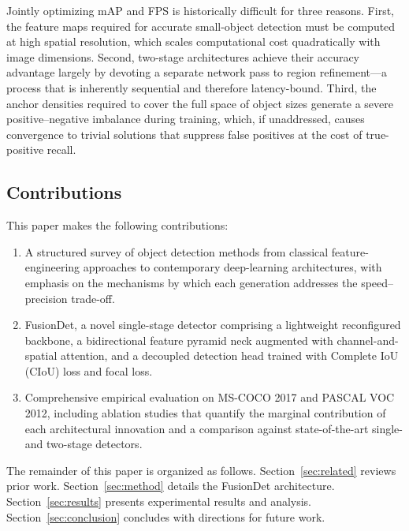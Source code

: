 Jointly optimizing mAP and FPS is historically difficult for
three reasons.  First, the feature maps required for accurate
small-object detection must be computed at high spatial
resolution, which scales computational cost quadratically with
image dimensions.  Second, two-stage architectures achieve
their accuracy advantage largely by devoting a separate network
pass to region refinement---a process that is inherently
sequential and therefore latency-bound.  Third, the anchor
densities required to cover the full space of object sizes
generate a severe positive--negative imbalance during training,
which, if unaddressed, causes convergence to trivial solutions
that suppress false positives at the cost of true-positive
recall.

\subsection{Contributions}

This paper makes the following contributions:
\begin{enumerate}
    \item A structured survey of object detection methods from
    classical feature-engineering approaches to contemporary
    deep-learning architectures, with emphasis on the
    mechanisms by which each generation addresses the
    speed--precision trade-off.
    \item FusionDet, a novel single-stage detector comprising
    a lightweight reconfigured backbone, a bidirectional
    feature pyramid neck augmented with channel-and-spatial
    attention, and a decoupled detection head trained with
    Complete IoU (CIoU) loss and focal loss.
    \item Comprehensive empirical evaluation on MS-COCO 2017
    and PASCAL VOC 2012, including ablation studies that
    quantify the marginal contribution of each architectural
    innovation and a comparison against state-of-the-art
    single- and two-stage detectors.
\end{enumerate}

The remainder of this paper is organized as follows.
Section~\ref{sec:related} reviews prior work.
Section~\ref{sec:method} details the FusionDet architecture.
Section~\ref{sec:results} presents experimental results and
analysis.  Section~\ref{sec:conclusion} concludes with
directions for future work.
